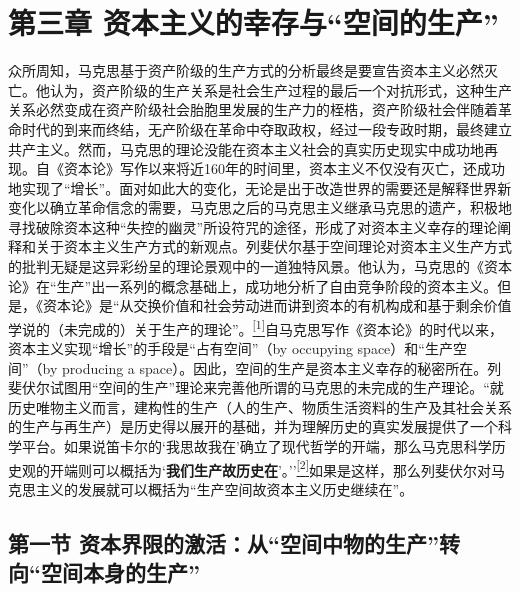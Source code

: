 \documentclass[UTF8, fontset = sourcesans, a4paper, oneside, zihao =
-4, scheme=chinese, no-math, space=true]{ctexbook}
\begin{document}
\hypertarget{part0007_split_000.htmlux5cux23a007}{\chapter{\texorpdfstring{第三章
资本主义的幸存与``空间的生产''}{第三章 资本主义的幸存与空间的生产}}\label{part0007_split_000.htmlux5cux23a007}}

众所周知，马克思基于资产阶级的生产方式的分析最终是要宣告资本主义必然灭亡。他认为，资产阶级的生产关系是社会生产过程的最后一个对抗形式，这种生产关系必然变成在资产阶级社会胎胞里发展的生产力的桎梏，资产阶级社会伴随着革命时代的到来而终结，无产阶级在革命中夺取政权，经过一段专政时期，最终建立共产主义。然而，马克思的理论没能在资本主义社会的真实历史现实中成功地再现。自《资本论》写作以来将近160年的时间里，资本主义不仅没有灭亡，还成功地实现了``增长''。面对如此大的变化，无论是出于改造世界的需要还是解释世界新变化以确立革命信念的需要，马克思之后的马克思主义继承马克思的遗产，积极地寻找破除资本这种``失控的幽灵''所设符咒的途径，形成了对资本主义幸存的理论阐释和关于资本主义生产方式的新观点。列斐伏尔基于空间理论对资本主义生产方式的批判无疑是这异彩纷呈的理论景观中的一道独特风景。他认为，马克思的《资本论》在``生产''出一系列的概念基础上，成功地分析了自由竞争阶段的资本主义。但是，《资本论》是``从交换价值和社会劳动进而讲到资本的有机构成和基于剩余价值学说的（未完成的）关于生产的理论''。\protect\hypertarget{part0007_split_000.htmlux5cux23w1}{}{}\protect\hyperlink{part0007_split_004.htmlux5cux23m1}{\textsuperscript{{[}1{]}}}自马克思写作《资本论》的时代以来，资本主义实现``增长''的手段是``占有空间''（by
occupying space）和``生产空间''（by producing a
space）。因此，空间的生产是资本主义幸存的秘密所在。列斐伏尔试图用``空间的生产''理论来完善他所谓的马克思的未完成的生产理论。``就历史唯物主义而言，建构性的生产（人的生产、物质生活资料的生产及其社会关系的生产与再生产）是历史得以展开的基础，并为理解历史的真实发展提供了一个科学平台。如果说笛卡尔的`我思故我在'确立了现代哲学的开端，那么马克思科学历史观的开端则可以概括为`\textbf{我们生产故历史在}'。''\protect\hypertarget{part0007_split_000.htmlux5cux23w2}{}{}\protect\hyperlink{part0007_split_004.htmlux5cux23m2}{\textsuperscript{{[}2{]}}}如果是这样，那么列斐伏尔对马克思主义的发展就可以概括为``生产空间故资本主义历史继续在''。

\protect\hypertarget{part0007_split_001.html}{}{}

\hypertarget{part0007_split_001.htmlux5cux23b007}{\section{\texorpdfstring{第一节
资本界限的激活：从``空间中物的生产''转向``空间本身的生产''}{第一节 资本界限的激活：从空间中物的生产转向空间本身的生产}}\label{part0007_split_001.htmlux5cux23b007}}
\end{document}
